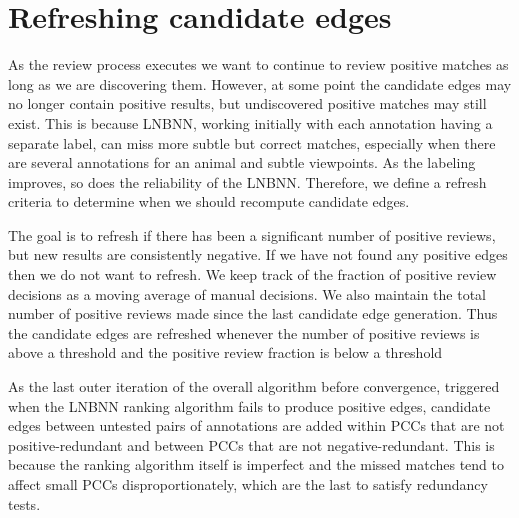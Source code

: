 

\section{Refreshing candidate edges}\label{sec:refresh}

As the review process executes we want to continue to review positive matches
  as long as we are discovering them.
However, at some point the candidate edges may no longer contain positive
  results, but undiscovered positive matches may still exist.
This is because LNBNN, working initially with each annotation having a
  separate label, can miss more subtle but correct matches, especially when
  there are several annotations for an animal and subtle viewpoints.
As the labeling improves, so does the reliability of the LNBNN.
Therefore, we define a refresh criteria to determine when we should recompute
  candidate edges.

The goal is to refresh if there has been a significant number of positive
  reviews, but new results are consistently negative.
If we have not found any positive edges then we do not want to refresh.
We keep track of the fraction of positive review decisions as a moving average
  of manual decisions.
We also maintain the total number of positive reviews made since the last
  candidate edge generation.
Thus the candidate edges are refreshed whenever the number of positive reviews
  is above a threshold and the positive review fraction is below a threshold

As the last outer iteration of the overall algorithm before convergence,
  triggered when the LNBNN ranking algorithm fails to produce positive edges,
  candidate edges between untested pairs of annotations are added within PCCs
  that are not positive-redundant and between PCCs that are not
  negative-redundant.
This is because the ranking algorithm itself is imperfect and the missed
  matches tend to affect small PCCs disproportionately, which are the last to
  satisfy redundancy tests.


